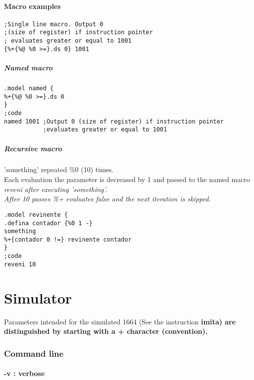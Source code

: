 \documentclass[a4paper,11pt]{article}
\begin{document}
\subsection{Macro examples}
\begin{verbatim}
;Single line macro. Output 0 
;(size of register) if instruction pointer
; evaluates greater or equal to 1001
{%+{%@ %0 >=}.ds 0} 1001
\end{verbatim}

\subsubsection{Named macro}
\begin{verbatim}
.model named {
%+{%@ %0 >=}.ds 0
}
;code
named 1001 ;Output 0 (size of register) if instruction pointer
           ;evaluates greater or equal to 1001
\end{verbatim}

\subsubsection{Recursive macro}
'something' repeated \%0 (10) times.\\
 Each evaluation the parameter is decreased by 1 and passed to the named macro \sl reveni \rm after executing 'something'.\\
 After 10 passes \%+ evaluates false and the next iteration is skipped.\\

\begin{verbatim}
.model revinente {
.defina contador {%0 1 -}
something
%+{contador 0 !=} revinente contador
}
;code
reveni 10

\end{verbatim}

\pagebreak
\part{Simulator}
Parameters intended for the simulated 1664 (See the instruction \bf imita\rm) are distinguished by starting with a \bf + \rm character (convention).\\

\section{Command line}
\subsection{-v : verbose}
\end{document}
